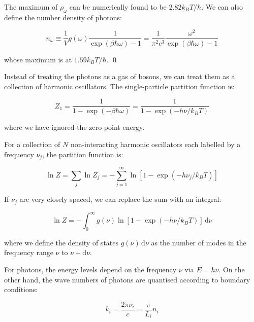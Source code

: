 \documentclass[12pt]{article}
\begin{document}
The maximum of $\rho_{\omega}$ can be numerically found to be $2.82 k_{B}T/\hbar$. We can also define the number density of photons:

\begin{equation}
    n_{\omega} \equiv \frac{1}{V} g(\omega) \frac{1}{\exp\left( \beta \hbar \omega \right) - 1} = \frac{1}{\pi^{2}c^{3}} \frac{\omega^{2}}{\exp\left( \beta \hbar \omega \right) - 1}
\end{equation}

whose maximum is at $1.59 k_{B}T/\hbar$.
\qed


Instead of treating the photons as a gas of bosons, we can treat them as a collection of harmonic oscillators. The single-particle partition function is:

\begin{equation}
    Z_{1} = \frac{1}{1 - \exp\left( -\beta \hbar \omega \right)} = \frac{1}{1 - \exp\left( -h\nu/k_{B}T \right)}
\end{equation}

where we have ignored the zero-point energy.

For a collection of $N$ non-interacting harmonic oscillators each labelled by a frequency $\nu_{j}$, the partition function is:

\begin{equation}
    \ln{Z} = \sum_{j} \ln{Z_{j}} = -\sum_{j = 1}^{\infty} \ln{\left[ 1 - \exp\left( -h \nu_{j}/k_{B}T \right) \right]}
\end{equation}

If $\nu_{j}$ are very closely spaced, we can replace the sum with an integral:

\begin{equation}
    \ln{Z} = -\int_{0}^{\infty} g(\nu) \ln{\left[ 1 - \exp\left( -h \nu/k_{B}T \right) \right]} \, \mathrm{d}\nu
\end{equation}

where we define the density of states $g(\nu) \, \mathrm{d}\nu$ as the number of modes in the frequency range $\nu$ to $\nu + \mathrm{d}\nu$.

For photons, the energy levels depend on the frequency $\nu$ via $E = h \nu$. On the other hand, the wave numbers of photons are quantised according to boundary conditions:

\begin{equation}
    k_{i} = \frac{2\pi \nu_{i}}{c} = \frac{\pi}{L_{i}} n_{i}
\end{equation}
\end{document}
